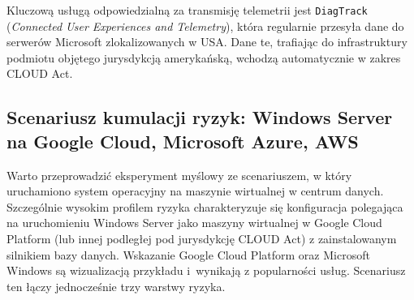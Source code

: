 Kluczową usługą odpowiedzialną za transmisję telemetrii jest
\texttt{DiagTrack} (\textit{Connected User Experiences and Telemetry}),
która regularnie przesyła dane do serwerów Microsoft zlokalizowanych w USA.
Dane te, trafiając do infrastruktury podmiotu objętego jurysdykcją
amerykańską, wchodzą automatycznie w zakres CLOUD Act.






\subsection{Scenariusz kumulacji ryzyk: Windows Server na Google Cloud, Microsoft Azure, AWS}

Warto przeprowadzić eksperyment myślowy ze scenariuszem, w który  uruchamiono system operacyjny na maszynie wirtualnej w centrum danych. Szczególnie wysokim profilem ryzyka charakteryzuje się konfiguracja polegająca na uruchomieniu Windows Server jako maszyny wirtualnej w Google Cloud Platform (lub innej podległej pod jurysdykcję CLOUD Act) z zainstalowanym silnikiem bazy danych.
Wskazanie Google Cloud Platform oraz Microsoft Windows są wizualizacją przykładu i~wynikają z popularności usług.
\vspace{0.3cm}
\noindent Scenariusz ten łączy jednocześnie trzy warstwy ryzyka.
 
